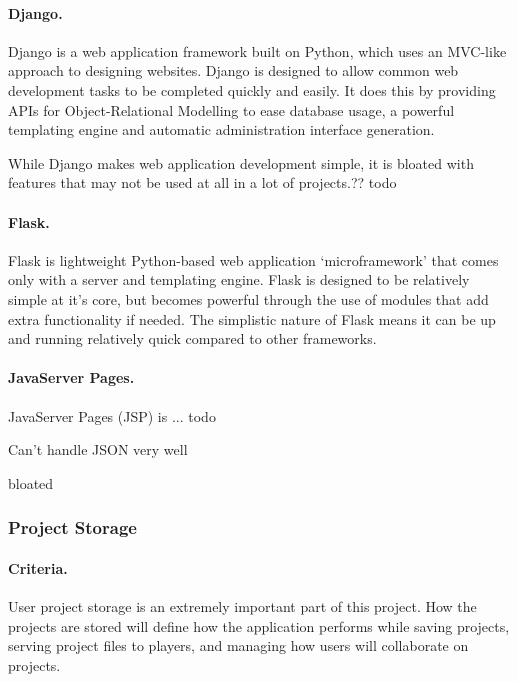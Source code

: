 \documentclass[a4paper, 12pt]{article}
\begin{document}


\paragraph{Django.}
Django is a web application framework built on Python, which uses an MVC-like approach to designing websites. Django is designed to allow common web development tasks to be completed quickly and easily. It does this by providing APIs for Object-Relational Modelling to ease database usage, a powerful templating engine and automatic administration interface generation.


While Django makes web application development simple, it is bloated with features that may not be used at all in a lot of projects.?? todo

\paragraph{Flask.}
Flask is lightweight Python-based web application `microframework' that comes only with a server and templating engine. Flask is designed to be relatively simple at it's core, but becomes powerful through the use of modules that add extra functionality if needed. The simplistic nature of Flask means it can be up and running relatively quick compared to other frameworks.



\paragraph{JavaServer Pages.}
JavaServer Pages (JSP) is ... todo


Can’t handle JSON very well

bloated



\subsubsection{Project Storage}
\paragraph{Criteria.}
User project storage is an extremely important part of this project. How the projects are stored will define how the application performs while saving projects, serving project files to players, and managing how users will collaborate on projects.
\end{document}

